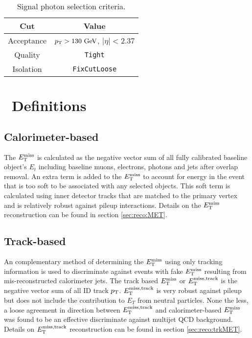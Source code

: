 \begin{table}[htp]
  \caption{Signal photon selection criteria.} 
  \begin{center}
    \begin{tabular}{c|c} \hline \hline
      Cut & Value \\ \hline \hline
      Acceptance & $\pT > 130 \gev$, $|\eta| < 2.37$ \\ \hline
      Quality & {\tt Tight} \\ \hline
      Isolation &  {\tt FixCutLoose} \\ \hline
      \hline
    \end{tabular}
  \end{center}
  \label{tb:photons}
\end{table}%

\section{\met\ Definitions} 
\label{sec:Selection_MET}

\subsection{\boldmath Calorimeter-based \met}

\indent The $E_{\mathrm{T}}^{\mathrm{miss}}$ is calculated as the negative vector sum of all fully calibrated baseline object's $E_t$ including baseline muons, electrons, photons and jets after overlap removal.   An extra term is added to the $E_{\mathrm{T}}^{\mathrm{miss}}$ to account for energy in the event that is too soft to be associated with any selected objects. This soft term is calculated using inner detector tracks that are matched to the primary vertex and is relatively robust against pileup interactions.  Details on the $E_{\mathrm{T}}^{\mathrm{miss}}$ reconstruction can be found in section \ref{sec:reco:MET}. \\ 

\subsection{\boldmath Track-based \MET}

\indent An complementary method of determining the $E_{\mathrm{T}}^{\mathrm{miss}}$ using only tracking information is used to discriminate against events with fake $E_{\mathrm{T}}^{\mathrm{miss}}$ resulting from mis-reconstructed calorimeter jets.  The track based $E_{\mathrm{T}}^{\mathrm{miss}}$ or $E_{\mathrm{T}}^{\mathrm{miss, track}}$ is the negative vector sum of all ID track $p_{\mathrm{T}}$.  $E_{\mathrm{T}}^{\mathrm{miss, track}}$ is very robust against pileup but does not include the contribution to $E_T$ from neutral particles.  None the less, a loose agreement in direction between $E_{\mathrm{T}}^{\mathrm{miss, track}}$ and calorimeter-based $E_{\mathrm{T}}^{\mathrm{miss}}$ was found to be an effective discriminate against multijet QCD background.  Details on $E_{\mathrm{T}}^{\mathrm{miss, track}}$ reconstruction can be found in section \ref{sec:reco:trkMET}. \\

